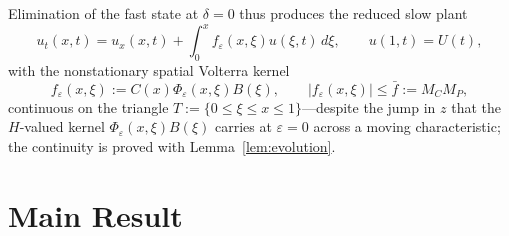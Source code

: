 \documentclass[12pt]{article}
\theoremstyle{plain}
\theoremstyle{remark}
\newcommand{\Hs}{H}
\begin{document}
Elimination of the fast state at $\delta=0$ thus produces the reduced slow plant
\begin{equation}
 u_t(x,t)=u_x(x,t)+\int_0^xf_\varepsilon(x,\xi)u(\xi,t)\,d\xi,
 \qquad u(1,t)=U(t),
 \label{eq:genreslow}
\end{equation}
with the nonstationary spatial Volterra kernel
\begin{equation}
 f_\varepsilon(x,\xi):=C(x)\Phi_\varepsilon(x,\xi)B(\xi),
 \qquad
 |f_\varepsilon(x,\xi)|\le\bar f:=M_CM_P,
 \label{eq:Kgen}
\end{equation}
continuous on the triangle $T:=\{0\le\xi\le x\le1\}$---despite the jump in $z$ that the $\Hs$-valued kernel $\Phi_\varepsilon(x,\xi)B(\xi)$ carries at $\varepsilon=0$ across a moving characteristic; the continuity is proved with Lemma~\ref{lem:evolution}.

\section{Main Result}\label{sec:main}
\end{document}
